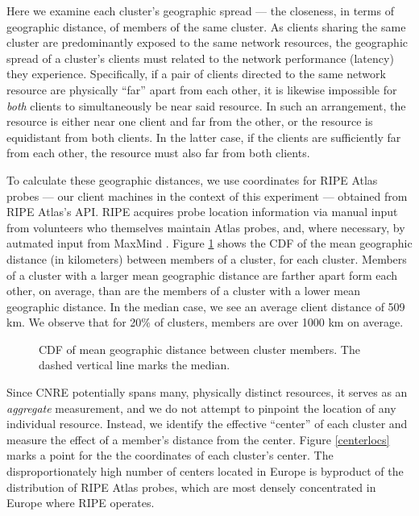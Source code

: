 
Here we examine each cluster's geographic spread --- the closeness, in terms of
geographic distance, of members of the same cluster. As clients sharing the same
cluster are predominantly exposed to the same network resources, the geographic
spread of a cluster's clients must related to the network performance (latency)
they experience. Specifically, if a pair of clients directed
to the same network resource are physically ``far'' apart from each other, it is
likewise impossible for \emph{both} clients to simultaneously be near said
resource. In such an arrangement, the resource is either near one client and far from the other, or the
resource is equidistant from both clients. In the latter case, if the clients
are sufficiently far from each other, the resource must also far from both clients.

To calculate these geographic distances, we use coordinates for RIPE Atlas
probes --- our client machines in the context of this experiment --- obtained
from RIPE Atlas's API. RIPE acquires probe location information via manual input
from volunteers who themselves maintain Atlas probes, and, where necessary, by
autmated input from MaxMind \cite{maxmind}. Figure \ref{geomeans} shows the CDF of the
mean geographic distance (in kilometers) between members of a cluster, for each
cluster. Members of a cluster with a larger mean geographic distance are farther
apart form each other, on average, than are the members of a cluster with a
lower mean geographic distance. In the median case, we see an average client
distance of 509 km. We observe that for 20\% of clusters, members are over 1000
km on average.  


\begin{figure}
    \caption{CDF of mean geographic distance between
    cluster members. The dashed vertical line marks the median.}
    \label{geomeans}
\end{figure}

Since CNRE potentially spans many, physically distinct resources, it serves as
an \emph{aggregate} measurement, and we do not attempt to pinpoint the location
of any individual resource. Instead, we identify the effective ``center'' of
each cluster and measure the effect of a member's distance from the center.
Figure \ref{centerlocs} marks a point for the the coordinates of each cluster's
center. The disproportionately high number of centers located in Europe is
byproduct of the distribution of RIPE Atlas probes, which are most densely
concentrated in Europe where RIPE operates. 

